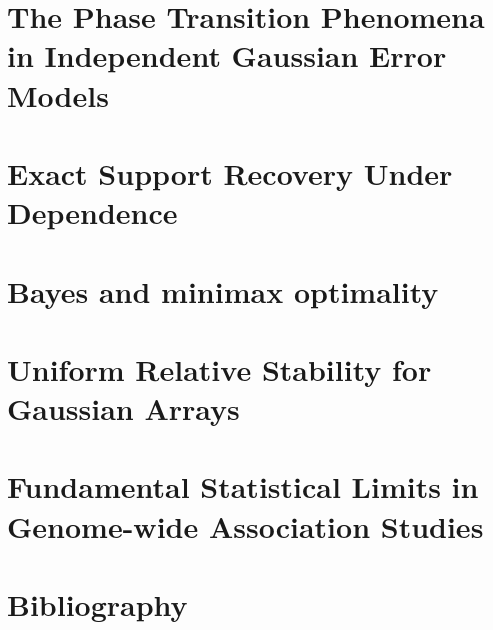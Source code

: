 \documentclass[graybox,envcountchap,sectrefs]{svmono}
\newcommand\comment[1]{{}}
\begin{document}
\chapter{The Phase Transition Phenomena in Independent Gaussian Error Models} 
\label{chap:phase-transitions}



\chapter{Exact Support Recovery Under Dependence }%
\label{chap:exact-support-recovery}


\chapter{Bayes and minimax optimality}
\label{chap:optimality}


\chapter{\comment{Characterization of} Uniform Relative Stability for Gaussian Arrays}
\label{chap:URS}



\chapter{\comment{The Phase Transition Phenomena in}
Fundamental Statistical Limits in Genome-wide Association Studies} 
\label{chap:GWAS}





%
%
%

\backmatter%

%
%


\chapter*{Bibliography}




\appendix
 

%
\end{document}
